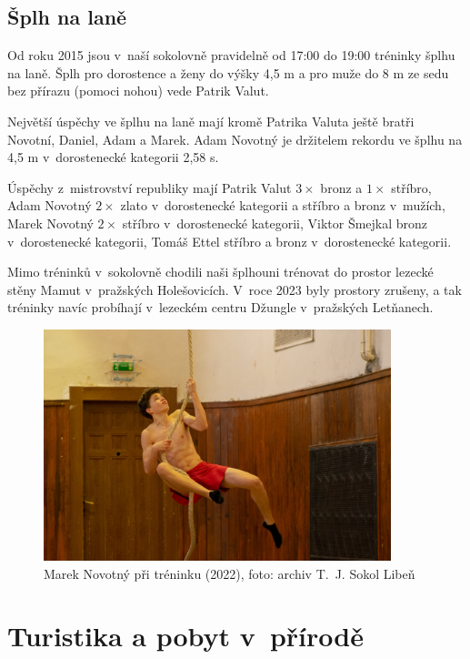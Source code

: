 \documentclass[a5paper, 11pt, twoside]{article}
\begin{document}
\subsection{Šplh na laně}

Od roku 2015 jsou v~naší sokolovně pravidelně od 17:00 do 19:00 tréninky
šplhu na laně. Šplh pro dorostence a ženy do výšky 4,5 m a pro muže do 8
m ze sedu bez přírazu (pomoci nohou) vede Patrik Valut.

Největší úspěchy ve šplhu na laně mají kromě Patrika Valuta ještě bratři
Novotní, Daniel, Adam a Marek. Adam Novotný je držitelem rekordu ve
šplhu na 4,5 m v~dorostenecké kategorii 2,58 s.

Úspěchy z~mistrovství republiky mají Patrik Valut \(3\times\) bronz a \(1\times\) stříbro,
Adam Novotný \(2\times\) zlato v~dorostenecké kategorii a stříbro a bronz
v~mužích, Marek Novotný \(2\times\) stříbro v~dorostenecké kategorii, Viktor
Šmejkal bronz v~dorostenecké kategorii, Tomáš Ettel stříbro a bronz
v~dorostenecké kategorii.

Mimo tréninků v~sokolovně chodili naši šplhouni trénovat do prostor
lezecké stěny Mamut v~pražských Holešovicích. V~roce 2023 byly prostory
zrušeny, a tak tréninky navíc probíhají v~lezeckém centru Džungle
v~pražských Letňanech.

\begin{figure}[h]
  \centering 
  \includegraphics[width=0.9\textwidth]{img/76_splh.jpg}
  \caption*{Marek Novotný při tréninku (2022), foto: archiv T.~J. Sokol Libeň}
\end{figure}

\section{Turistika a pobyt v~přírodě}
\end{document}
